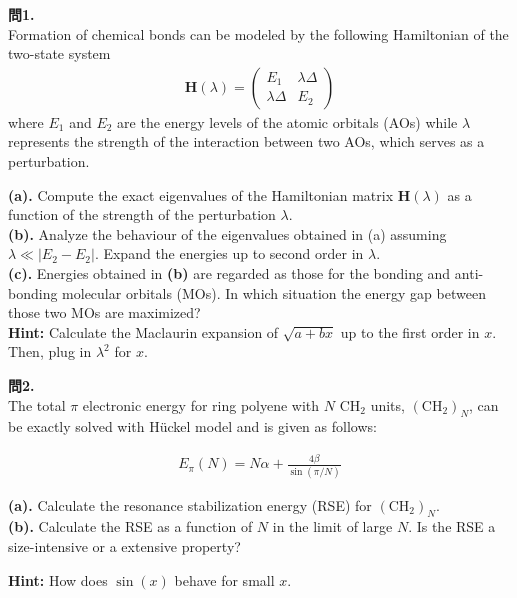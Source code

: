 \documentclass{jlreq}
\begin{document}
\noindent
\textbf{問1.}\\

\noindent
Formation of chemical bonds can be modeled by the following Hamiltonian of the two-state system
\begin{eqnarray}
    \mathbf{H}(\lambda)=
    \begin{pmatrix}
    E_1 & \lambda\Delta \\ 
    \lambda\Delta & E_2
    \end{pmatrix}
\end{eqnarray}
where $E_1$ and $E_2$ are the energy levels of the atomic orbitals (AOs) while $\lambda$ represents the strength of the interaction between two AOs, which serves as a perturbation.

\noindent
\textbf{(a).} Compute the exact eigenvalues of the Hamiltonian matrix $\mathbf{H}(\lambda)$ as a function of the strength of the perturbation $\lambda$.\\
\noindent
\textbf{(b).} Analyze the behaviour of the eigenvalues obtained in (a)  assuming $\lambda \ll |E_2-E_2|$.  Expand the energies up to second order in $\lambda$.\\ 
\noindent
\textbf{(c).} Energies obtained in \textbf{(b)} are regarded as those for the bonding and anti-bonding molecular orbitals (MOs). In which situation the energy gap between those two MOs are maximized?\\

\noindent
\textbf{Hint:} Calculate the Maclaurin expansion of $\sqrt{a+bx}$ up to the first order in $x$. Then, plug in $\lambda^2$ for $x$. 

\clearpage

\noindent
\textbf{問2.}\\

\noindent
The total $\pi$ electronic energy for  ring polyene with $N$ $\text{CH}_2$ units, $(\text{CH}_2)_N$, can be exactly solved with H\"uckel model and is given as follows:

\begin{eqnarray}
    E_\pi(N)=N\alpha+\frac{4\beta}{\sin(\pi/N)}
\end{eqnarray}

\noindent
\textbf{(a).} Calculate the resonance stabilization energy (RSE) for  $(\text{CH}_2)_N$.\\
\noindent
\textbf{(b).} Calculate the RSE as a function of $N$ in the limit of large $N$. Is the RSE a size-intensive or a extensive property?

\noindent
\textbf{Hint:} How does $\sin(x)$ behave for small $x$.
\end{document}
